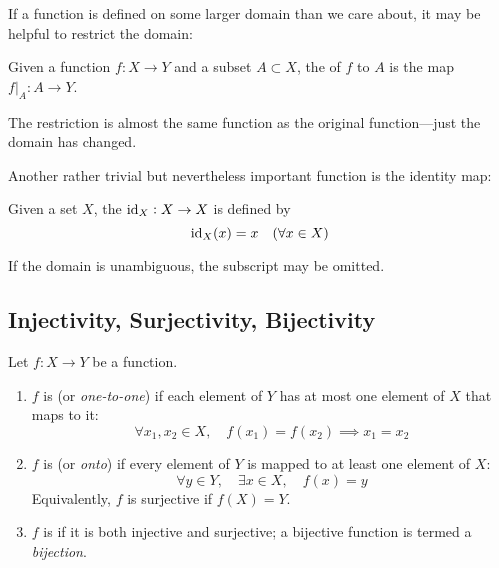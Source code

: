 If a function is defined on some larger domain than we care about, it may be helpful to restrict the domain:

\begin{definition}[Restriction]
Given a function $f:X \to Y$ and a subset $A \subset X$, the  of $f$ to $A$ is the map $f|_A:A \to Y$.
\end{definition}

\begin{remark}
The restriction is almost the same function as the original function---just the domain has changed.
\end{remark}

Another rather trivial but nevertheless important function is the identity map:

\begin{definition}
Given a set $X$, the  $\operatorname{id}_X:X \to X$ is defined by
\[\operatorname{id}_X(x)=x\quad(\forall x\in X)\]
\end{definition}

\begin{notation}
If the domain is unambiguous, the subscript may be omitted.
\end{notation}

\subsection{Injectivity, Surjectivity, Bijectivity}
\begin{definition}
Let $f:X\to Y$ be a function.
\begin{enumerate}[label=(\roman*)]
\item $f$ is  (or \emph{one-to-one}) if each element of $Y$ has at most one element of $X$ that maps to it:
\[\forall x_1,x_2\in X,\quad f(x_1)=f(x_2) \implies x_1=x_2\]

\item $f$ is  (or \emph{onto}) if every element of $Y$ is mapped to at least one element of $X$:
\[ \forall y\in Y,\quad\exists x\in X,\quad f(x)=y \]
Equivalently, $f$ is surjective if $f(X)=Y$.

\item $f$ is  if it is both injective and surjective; a bijective function is termed a \emph{bijection}.
\end{enumerate}
\end{definition}

